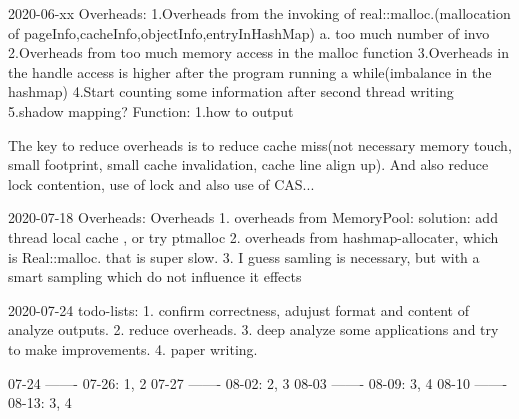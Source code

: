2020-06-xx
Overheads:
1.Overheads from the invoking of real::malloc.(mallocation of pageInfo,cacheInfo,objectInfo,entryInHashMap)
a. too much number of invo
2.Overheads from too much memory access in the malloc function
3.Overheads in the handle access is higher after the program running a while(imbalance in the hashmap)
4.Start counting some information after second thread writing
5.shadow mapping?
Function:
1.how to output

The key to reduce overheads is to reduce cache miss(not necessary memory touch, small footprint, small cache invalidation, cache line align up).
And also reduce lock contention, use of lock and also use of CAS...


2020-07-18 Overheads:
Overheads
1. overheads from MemoryPool:
solution: add thread local cache , or try ptmalloc
2. overheads from hashmap-allocater, which is Real::malloc. that is super slow.
3. I guess samling is necessary, but with a smart sampling which do not influence it effects




2020-07-24 todo-lists:
1. confirm correctness, adujust format and content of analyze outputs.
2. reduce overheads.
3. deep analyze some applications and try to make improvements.
4. paper writing.

07-24 ------- 07-26: 1, 2
07-27 ------- 08-02: 2, 3
08-03 ------- 08-09: 3, 4
08-10 ------- 08-13: 3, 4

